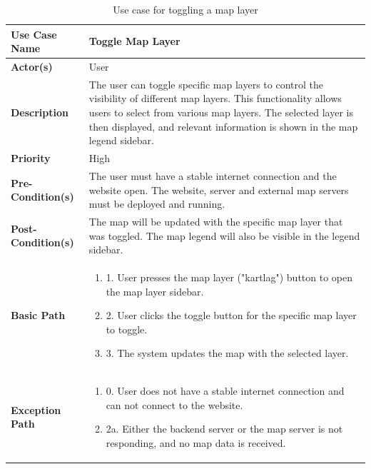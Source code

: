 \begin{table}[h]
    \centering
    \begin{tabularx}{\textwidth}{|l|X|}
        \hline
        \rowcolor{gray!20}
        \textbf{Use Case Name} & Toggle Map Layer \\
        \hline
        \textbf{Actor(s)} & User \\
        \hline
        \textbf{Description} & The user can toggle specific map layers to control the visibility of different map layers. This functionality allows users to select from various map layers. The selected layer is then displayed, and relevant information is shown in the map legend sidebar. \\
        \hline
        \textbf{Priority} & High \\
        \hline
        \textbf{Pre-Condition(s)} & The user must have a stable internet connection and the website open. The website, server and external map servers must be deployed and running.\\
        \hline
        \textbf{Post-Condition(s)} & The map will be updated with the specific map layer that was toggled. The map legend will also be visible in the legend sidebar. \\
        \hline
        \textbf{Basic Path} &  
        \begin{enumerate}[label=,left=0pt]
            \item 1. User presses the map layer ("kartlag") button to open the map layer sidebar.
            \item 2. User clicks the toggle button for the specific map layer to toggle.
            \item 3. The system updates the map with the selected layer.
        \end{enumerate} \\
        \hline
        \textbf{Exception Path} & 
        \begin{enumerate}[label=,left=0pt]
            \item 0. User does not have a stable internet connection and can not connect to the website.
            \item 2a. Either the backend server or the map server is not responding, and no map data is received.
        \end{enumerate} \\
        \hline
    \end{tabularx}
    \caption[Use Case Specification: Toggle Map Layer]{Use case for toggling a map layer}
    \label{tab:use_case_toggle_layer}
\end{table}
